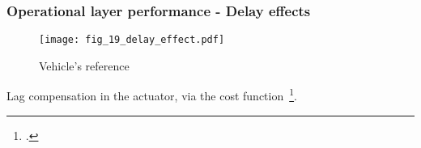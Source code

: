 \begin{frame}
    \frametitle{Operational layer performance - Delay effects }
      \begin{figure}
        \centering
        \texttt{[image: fig\_19\_delay\_effect.pdf]}
        \caption{Vehicle's reference}
      \end{figure}
    Lag compensation in the actuator, via the cost function~\footcite{Wang2018:TransportmetricaB}.
\end{frame}